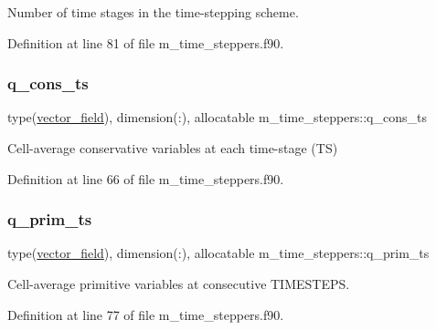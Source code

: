 Number of time stages in the time-\/stepping scheme. 



Definition at line 81 of file m\+\_\+time\+\_\+steppers.\+f90.

\mbox{\label{namespacem__time__steppers_a4bbe3aedc07e11e85679ec0c7a094f37}} 
\subsubsection{\texorpdfstring{q\+\_\+cons\+\_\+ts}{q\_cons\_ts}}
{\footnotesize\ttfamily type(\hyperlink{structm__derived__types_1_1vector__field}{vector\+\_\+field}), dimension(\+:), allocatable m\+\_\+time\+\_\+steppers\+::q\+\_\+cons\+\_\+ts}



Cell-\/average conservative variables at each time-\/stage (TS) 



Definition at line 66 of file m\+\_\+time\+\_\+steppers.\+f90.

\mbox{\label{namespacem__time__steppers_a5fbb5dbdd477579d17f067ec7900e659}} 
\subsubsection{\texorpdfstring{q\+\_\+prim\+\_\+ts}{q\_prim\_ts}}
{\footnotesize\ttfamily type(\hyperlink{structm__derived__types_1_1vector__field}{vector\+\_\+field}), dimension(\+:), allocatable m\+\_\+time\+\_\+steppers\+::q\+\_\+prim\+\_\+ts}



Cell-\/average primitive variables at consecutive T\+I\+M\+E\+S\+T\+E\+PS. 



Definition at line 77 of file m\+\_\+time\+\_\+steppers.\+f90.

\mbox{\label{namespacem__time__steppers_a10a568906592e51b56cf5dbfba0d9edb}} 
